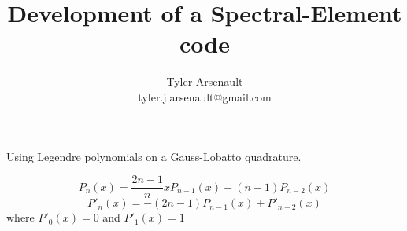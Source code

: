 \documentclass[12pt]{article}%
\title{Development of a Spectral-Element code}
\author{Tyler Arsenault\\ tyler.j.arsenault@gmail.com}
\date{}
\begin{document}
\maketitle

Using Legendre polynomials on a Gauss-Lobatto quadrature.

\[P_n(x)=\frac{2n-1}{n}xP_{n-1}(x)-(n-1)P_{n-2}(x)\]
%
\[P'_n(x)=-(2n-1)P_{n-1}(x)+P'_{n-2}(x)\]
where $P'_0(x)=0$ and $P'_1(x)=1$
\end{document}
